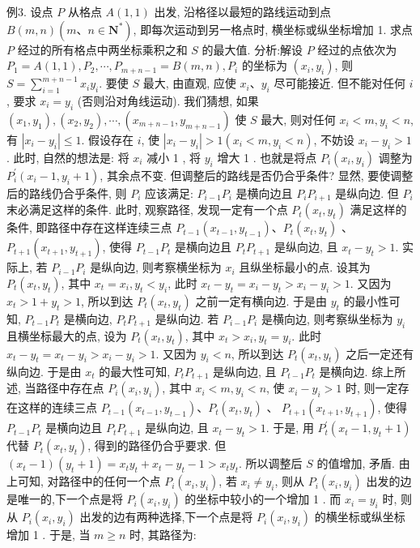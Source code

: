 例3. 设点 $P$ 从格点 $A(1,1)$ 出发, 沿格径以最短的路线运动到点 $B(m, n)\left(m 、 n \in \mathbf{N}^*\right)$, 即每次运动到另一格点时, 横坐标或纵坐标增加 1. 求点 $P$ 经过的所有格点中两坐标乘积之和 $S$ 的最大值.
分析:解设 $P$ 经过的点依次为 $P_1=A(1,1), P_2, \cdots, P_{m+n-1}=B(m, n), P_i$ 的坐标为 $\left(x_i, y_i\right)$, 则 $S=\sum_{i=1}^{m+n-1} x_i y_i$. 要使 $S$ 最大, 由直观, 应使 $x_i 、 y_i$ 尽可能接近.
但不能对任何 $i$, 要求 $x_i=y_i$ (否则沿对角线运动). 我们猜想, 如果 $\left(x_1, y_1\right),\left(x_2, y_2\right), \cdots,\left(x_{m+n-1}, y_{m+n-1}\right)$ 使 $S$ 最大, 则对任何 $x_i<m, y_i<n$, 有 $\left|x_i-y_i\right| \leqslant 1$.
假设存在 $i$, 使 $\left|x_i-y_i\right|>1\left(x_i<m, y_i<n\right)$, 不妨设 $x_i-y_i>1$. 此时, 自然的想法是: 将 $x_i$ 减小 1 , 将 $y_i$ 增大 1 . 也就是将点 $P_i\left(x_i, y_i\right)$ 调整为 $P_i^{\prime}\left(x_i-\right. \left.1, y_i+1\right)$, 其余点不变.
但调整后的路线是否仍合乎条件? 显然, 要使调整后的路线仍合乎条件, 则 $P_i$ 应该满足: $P_{i-1} P_i$ 是横向边且 $P_i P_{i+1}$ 是纵向边.
但 $P_i$ 末必满足这样的条件.
此时, 观察路径, 发现一定有一个点 $P_t\left(x_t, y_t\right)$ 满足这样的条件, 即路径中存在这样连续三点 $P_{t-1}\left(x_{t-1}, y_{t-1}\right) 、 P_t\left(x_t, y_t\right)$ 、 $P_{t+1}\left(x_{t+1}, y_{t+1}\right)$, 使得 $P_{t-1} P_t$ 是横向边且 $P_t P_{t+1}$ 是纵向边, 且 $x_t-y_t>1$.
实际上, 若 $P_{i-1} P_i$ 是纵向边, 则考察横坐标为 $x_i$ 且纵坐标最小的点.
设其为 $P_t\left(x_t, y_t\right)$, 其中 $x_t=x_i, y_t<y_i$, 此时 $x_t-y_t=x_i-y_t>x_i-y_i>1$. 又因为 $x_t>1+y_t>1$, 所以到达 $P_t\left(x_t, y_t\right)$ 之前一定有横向边.
于是由 $y_t$ 的最小性可知, $P_{t-1} P_t$ 是横向边, $P_t P_{t+1}$ 是纵向边.
若 $P_{i-1} P_i$ 是横向边, 则考察纵坐标为 $y_i$ 且横坐标最大的点, 设为 $P_t\left(x_t, y_t\right)$, 其中 $x_t>x_i, y_t=y_i$. 此时 $x_t-y_t=x_t-y_i>x_i-y_i>1$. 又因为 $y_i<n$, 所以到达 $P_t\left(x_t, y_t\right)$ 之后一定还有纵向边.
于是由 $x_t$ 的最大性可知, $P_t P_{t+1}$ 是纵向边, 且 $P_{t-1} P_t$ 是横向边.
综上所述, 当路径中存在点 $P_i\left(x_i, y_i\right)$, 其中 $x_i<m, y_i<n$, 使 $x_i- y_i>1$ 时, 则一定存在这样的连续三点 $P_{t-1}\left(x_{t-1}, y_{t-1}\right) 、 P_t\left(x_t, y_t\right)$ 、 $P_{t+1}\left(x_{t+1}, y_{t+1}\right)$, 使得 $P_{t-1} P_t$ 是横向边且 $P_t P_{t+1}$ 是纵向边, 且 $x_t-y_t>1$. 于是, 用 $P_t^{\prime}\left(x_t-1, y_t+1\right)$ 代替 $P_t\left(x_t, y_t\right)$, 得到的路径仍合乎要求.
但 $\left(x_t-1\right) \left(y_t+1\right)=x_t y_t+x_t-y_t-1>x_t y_t$. 所以调整后 $S$ 的值增加, 矛盾.
由上可知, 对路径中的任何一个点 $P_i\left(x_i, y_i\right)$, 若 $x_i \neq y_i$, 则从 $P_i\left(x_i, y_i\right)$ 出发的边是唯一的,下一个点是将 $P_i\left(x_i, y_i\right)$ 的坐标中较小的一个增加 1 . 而 $x_i=y_i$ 时, 则从 $P_i\left(x_i, y_i\right)$ 出发的边有两种选择,下一个点是将 $P_i\left(x_i, y_i\right)$ 的横坐标或纵坐标增加 1 . 于是, 当 $m \geqslant n$ 时, 其路径为:
